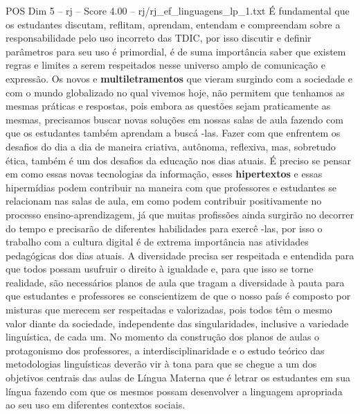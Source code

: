 \begin{textsample}{POS Dim 5 – rj – Score 4.00 – rj/rj\_ef\_linguagens\_lp\_1.txt}
É fundamental que os estudantes discutam, reflitam, aprendam, entendam e compreendam sobre a responsabilidade pelo uso incorreto das TDIC, por isso discutir e definir parâmetros para seu uso é primordial, é de suma importância saber que existem regras e limites a serem respeitados nesse universo amplo de comunicação e expressão.
Os novos e \textbf{multiletramentos} que vieram surgindo com a sociedade e com o mundo globalizado no qual vivemos hoje, não permitem que tenhamos as mesmas práticas e respostas, pois embora as questões sejam praticamente as mesmas, precisamos buscar novas soluções em nossas salas de aula fazendo com que os estudantes também aprendam a buscá -las.
Fazer com que enfrentem os desafios do dia a dia de maneira criativa, autônoma, reflexiva, mas, sobretudo ética, também é um dos desafios da educação nos dias atuais.
É preciso se pensar em como essas novas tecnologias da informação, esses \textbf{hipertextos} e essas hipermídias podem contribuir na maneira com que professores e estudantes se relacionam nas salas de aula, em como podem contribuir positivamente no processo ensino-aprendizagem, já que muitas profissões ainda surgirão no decorrer do tempo e precisarão de diferentes habilidades para exercê -las, por isso o trabalho com a cultura digital é de extrema importância nas atividades pedagógicas dos dias atuais.
A diversidade precisa ser respeitada e entendida para que todos possam usufruir o direito à igualdade e, para que isso se torne realidade, são necessários planos de aula que tragam a diversidade à pauta para que estudantes e professores se conscientizem de que o nosso país é composto por misturas que merecem ser respeitadas e valorizadas, pois todos têm o mesmo valor diante da sociedade, independente das singularidades, inclusive a variedade linguística, de cada um.
No momento da construção dos planos de aulas o protagonismo dos professores, a interdisciplinaridade e o estudo teórico das metodologias linguísticas deverão vir à tona para que se chegue a um dos objetivos centrais das aulas de Língua Materna que é letrar os estudantes em sua língua fazendo com que os mesmos possam desenvolver a linguagem apropriada ao seu uso em diferentes contextos sociais.

\end{textsample}
